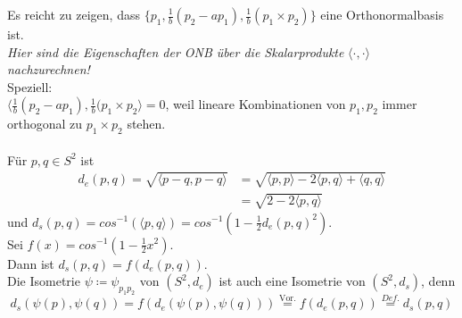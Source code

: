 \begin{problem*}[1b]
Es reicht zu zeigen, dass $\{ p_1, \frac{1}{b}(p_2 - ap_1), \frac{1}{b}(p_1 \times p_2) \}$ eine Orthonormalbasis ist.\\
\emph{Hier sind die Eigenschaften der ONB über die Skalarprodukte} $\langle \cdot , \cdot \rangle$ \emph{nachzurechnen!}\\
Speziell: \\
$\langle \frac{1}{b}(p_2 - ap_1), \frac{1}{b}(p_1 \times p_2\rangle = 0$, weil lineare Kombinationen von $ p_1, p_2 $ immer orthogonal zu $ p_1 \times p_2 $ stehen.\\
\\
Für $ p,q \in S^2$ ist 
\begin{align*}
	d_e(p,q) = \sqrt{ \langle p-q,p-q \rangle } &= \sqrt{ \langle p,p \rangle - 2\langle p,q \rangle + \langle q,q \rangle } \\
	&=\sqrt{ 2 - 2\langle p,q \rangle }
\end{align*}
und $d_s(p,q) = cos^{ -1 } (\langle p,q \rangle) = cos^{ -1 }(1- \frac{1}{2}d_e(p,q)^2)$.\\
Sei $f(x) = cos^{ -1 }(1- \frac{1}{2}x^2)$.\\
Dann ist $ d_s(p,q) = f(d_e(p,q)) $.\\
Die Isometrie $\psi \coloneqq \psi_{ p_1p_2 }$ von $ (S^2,d_e) $ ist auch eine Isometrie von $ (S^2, d_s)$, denn 
\begin{equation*}
	d_s(\psi(p),\psi(q)) = f \left( d_e(\psi(p), \psi(q))\right) \overset{ \text{Vor.} }{ = } 
	f(d_e(p,q)) \overset{ Def. }{ = } d_s(p,q)
\end{equation*}
\end{problem*}

